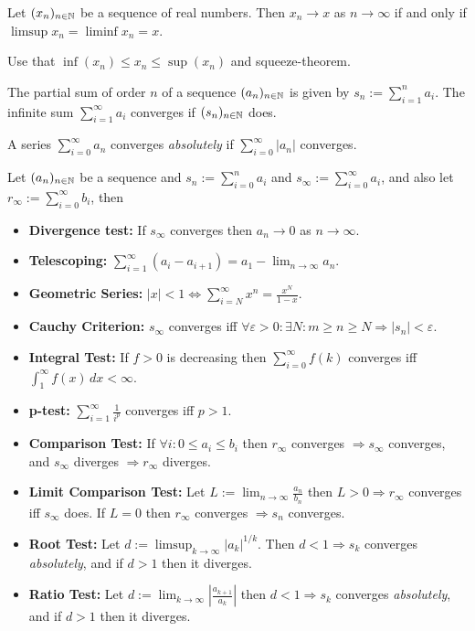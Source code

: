 \begin{multicols}{2}
\begin{theorem}[2.36]
Let $(x_n)_{n\in\mathbb{N}}$ be a sequence of real numbers. Then $x_n\to x$ as $n\to\infty$ if and only if $\limsup{x_n} = \liminf{x_n}=x$.
\end{theorem}
\begin{proof1}
Use that $\inf(x_n)\leq x_n\leq \sup(x_n)$ and squeeze-theorem.
\end{proof1}

\begin{definition}
The partial sum of order $n$ of a sequence $(a_n)_{n\in\mathbb{N}}$ is given by $s_n:=\sum_{i=1}^n a_i$. The infinite sum $\sum_{i=1}^\infty a_i$ converges if $(s_n)_{n\in\mathbb{N}}$ does.
\end{definition}

\begin{definition}
A series $\sum_{i=0}^\infty a_n$ converges \textit{absolutely} if $\sum_{i=0}^\infty |a_n|$ converges.
\end{definition}

\begin{theorem}
Let $(a_n)_{n\in\mathbb{N}}$ be a sequence and $s_n := \sum_{i=0}^n a_i$ and $s_\infty := \sum_{i=0}^\infty a_i$, and also let $r_\infty := \sum_{i=0}^\infty b_i$, then
\begin{itemize}
    \item{\textbf{Divergence test:} If $s_\infty$ converges then $a_n\to 0$ as $n\to\infty$.}
    \item{\textbf{Telescoping:} $\sum_{i=1}^\infty(a_i-a_{i+1}) = a_1 - \lim_{n\to\infty}a_n$.}
    \item{\textbf{Geometric Series:} $|x|<1 \Longleftrightarrow\sum_{i=N}^\infty x^n = \frac{x^N}{1-x}$.}
    \item{\textbf{Cauchy Criterion:} $s_\infty$ converges iff $\forall\varepsilon>0:\exists N: m\geq n\geq N \Rightarrow |s_n|<\varepsilon$.}
    \item{\textbf{Integral Test:} If $f>0$ is decreasing then $\sum_{i=0}^\infty f(k)$ converges iff $\int_1^\infty f(x)\,dx<\infty$.}
    \item{\textbf{p-test:} $\sum_{i=1}^\infty \frac{1}{i^p}$ converges iff $p>1$.}
    \item{\textbf{Comparison Test:} If $\forall i: 0\leq a_i\leq b_i$ then $r_\infty$ converges $\Rightarrow s_\infty$ converges, and $s_\infty$ diverges $\Rightarrow r_\infty$ diverges.}
    \item{\textbf{Limit Comparison Test:} Let $L:=\lim_{n\to\infty}\frac{a_n}{b_n}$ then $L>0\Rightarrow r_\infty$ converges iff $s_\infty$ does. If $L=0$ then $r_\infty$ converges $\Rightarrow s_n$ converges.}
    \item{\textbf{Root Test:} Let $d:=\limsup_{k\to\infty} |a_k|^{1/k}$. Then $d<1\Rightarrow s_k$ converges \textit{absolutely}, and if $d>1$ then it diverges.}
    \item{\textbf{Ratio Test:} Let $d:=\lim_{k\to\infty}\left|\frac{a_{k+1}}{a_k}\right|$ then $d<1\Rightarrow s_k$ converges \textit{absolutely}, and if $d>1$ then it diverges.}
\end{itemize}
\end{theorem}




\end{multicols}
